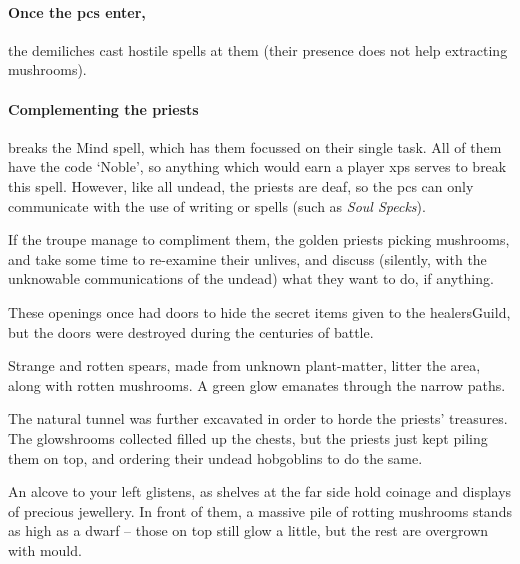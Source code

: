 \begin{multicols}{2}
\paragraph{Once the \glspl{pc} enter,}
the demiliches cast hostile spells at them (their presence does not help extracting mushrooms).

\paragraph{Complementing the priests}
breaks the Mind spell, which has them focussed on their single task.
All of them have the code `Noble', so anything which would earn a player \glspl{xp} serves to break this spell.%
However, like all undead, the priests are deaf, so the \glspl{pc} can only communicate with the use of writing or spells (such as \textit{Soul Specks}).

If the troupe manage to compliment them, the golden priests picking mushrooms, and take some time to re-examine their unlives, and discuss (silently, with the unknowable communications of the undead) what they want to do, if anything.


\begin{exampletext}
  These openings once had doors to hide the secret items given to the \gls{healersGuild}, but the doors were destroyed during the centuries of battle.
\end{exampletext}

Strange and rotten spears, made from unknown plant-matter, litter the area, along with rotten mushrooms.
A green glow emanates through the narrow paths.


\begin{exampletext}
  The natural tunnel was further excavated in order to horde the priests' treasures.
  The glowshrooms collected filled up the chests, but the priests just kept piling them on top, and ordering their undead hobgoblins to do the same.
\end{exampletext}

\begin{boxtext}
  An alcove to your left glistens, as shelves at the far side hold coinage and displays of precious jewellery.
  In front of them, a massive pile of rotting mushrooms stands as high as a dwarf -- those on top still glow a little, but the rest are overgrown with mould.


\end{boxtext}
\end{multicols}
